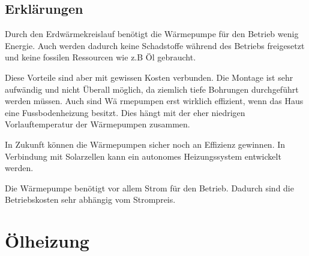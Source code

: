 \subsection{Erklärungen}

Durch den Erdwärmekreislauf benötigt die Wärmepumpe für den Betrieb wenig Energie. Auch werden dadurch keine Schadstoffe während des Betriebs freigesetzt und keine fossilen Ressourcen wie z.B Öl gebraucht.

Diese Vorteile sind aber mit gewissen Kosten verbunden. Die Montage ist sehr aufwändig und nicht Überall möglich, da ziemlich tiefe Bohrungen durchgeführt werden müssen. Auch sind Wä
rmepumpen erst wirklich effizient, wenn das Haus eine Fussbodenheizung besitzt. Dies hängt mit der eher niedrigen Vorlauftemperatur der Wärmepumpen zusammen.

In Zukunft können die Wärmepumpen sicher noch an Effizienz gewinnen. In Verbindung mit Solarzellen kann ein autonomes Heizungssystem entwickelt werden.

Die Wärmepumpe benötigt vor allem Strom für den Betrieb. Dadurch sind die Betriebskosten sehr abhängig vom Strompreis. 

\newpage

\section{Ölheizung}


